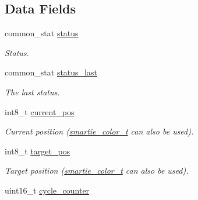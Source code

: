 \subsection*{Data Fields}
\begin{CompactItemize}
\item 
\hypertarget{structstepper__motor__t_71c0bbc3adc7f7f200e6853fd361c12d}{
common\_\-stat \hyperlink{structstepper__motor__t_71c0bbc3adc7f7f200e6853fd361c12d}{status}}
\label{structstepper__motor__t_71c0bbc3adc7f7f200e6853fd361c12d}

\begin{CompactList}\small\item\em Status. \item\end{CompactList}\item 
\hypertarget{structstepper__motor__t_4bbf149941b37969ce2a486bc7bea81e}{
common\_\-stat \hyperlink{structstepper__motor__t_4bbf149941b37969ce2a486bc7bea81e}{status\_\-last}}
\label{structstepper__motor__t_4bbf149941b37969ce2a486bc7bea81e}

\begin{CompactList}\small\item\em The last status. \item\end{CompactList}\item 
\hypertarget{structstepper__motor__t_00163b2a2a26dd96e68beb08f4eb3c6e}{
int8\_\-t \hyperlink{structstepper__motor__t_00163b2a2a26dd96e68beb08f4eb3c6e}{current\_\-pos}}
\label{structstepper__motor__t_00163b2a2a26dd96e68beb08f4eb3c6e}

\begin{CompactList}\small\item\em Current position (\hyperlink{system_8h_7b19b2744b17f8f369226dd73101a4b2}{smartie\_\-color\_\-t} can also be used). \item\end{CompactList}\item 
\hypertarget{structstepper__motor__t_a21f2e88216c74bd38d655b596b927c2}{
int8\_\-t \hyperlink{structstepper__motor__t_a21f2e88216c74bd38d655b596b927c2}{target\_\-pos}}
\label{structstepper__motor__t_a21f2e88216c74bd38d655b596b927c2}

\begin{CompactList}\small\item\em Target position (\hyperlink{system_8h_7b19b2744b17f8f369226dd73101a4b2}{smartie\_\-color\_\-t} can also be used). \item\end{CompactList}\item 
\hypertarget{structstepper__motor__t_af03118d7157229734ebbf8e5cc43c2d}{
uint16\_\-t \hyperlink{structstepper__motor__t_af03118d7157229734ebbf8e5cc43c2d}{cycle\_\-counter}}
\label{structstepper__motor__t_af03118d7157229734ebbf8e5cc43c2d}


\end{CompactItemize}
